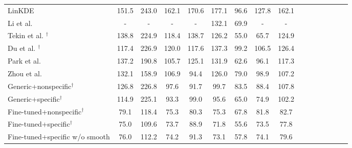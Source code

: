\begin{table}
\begin{tabular}{l*{15}{c}}
\toprule
LinKDE \cite{ionescu2014human} & 151.5 & 243.0 & 162.1 & 170.6 & 177.1 & 96.6 & 127.8 & 162.1  \\
Li et al. \cite{li2015maximum} & - & - & - & - & 132.1 & 69.9 & - & - \\
Tekin et al. \cite{tekin2015predicting}$^\dagger$ & 138.8 & 224.9 & 118.4 & 138.7 & 126.2 & {55.0 }& {65.7 }& 124.9  \\
Du et al. \cite{du2016marker}$^\dagger$  &        117.4 &       226.9&        120.0 &        117.6 &        137.3 &        99.2 &        106.5 &        126.4 \\
Park et al. \cite{park20163d}  &         137.2 &        190.8 &        105.7 &        125.1 &       131.9 &        62.6 &        96.1 &        117.3 \\
Zhou et al. \cite{zhou2016deep}  &        132.1 &        158.9 &        106.9 &        94.4 &        126.0 &        79.0 &        98.9 &        107.2 \\
Generic+nonspecific$^\dagger$ & 126.8 &        226.8 &         97.6 &         91.7 &         99.7 &         83.5 &         88.4 &        107.8 \\
Generic+specific$^\dagger$ & 114.9 &        225.1 &         93.3 &         99.0 &         95.6 &         65.0 &         74.9 &        102.2 \\
Fine-tuned+nonspecific$^\dagger$ & 79.1 &        118.4 &         75.3 &         80.3 &         75.3 &         67.8 &         81.8 &         82.7 \\
Fine-tuned+specific$^\dagger$ & 75.0 &        109.6 &         73.7 &         88.9 &         71.8 &         55.6 &         73.5 &         77.8 \\
Fine-tuned+specific w/o smooth &         76.0 &        112.2 &         74.2 &         91.3 &         73.1 &         57.8 &         74.1 &         79.6 \\
\toprule
\end{tabular}
\label{tab:h36m}
\end{table}

